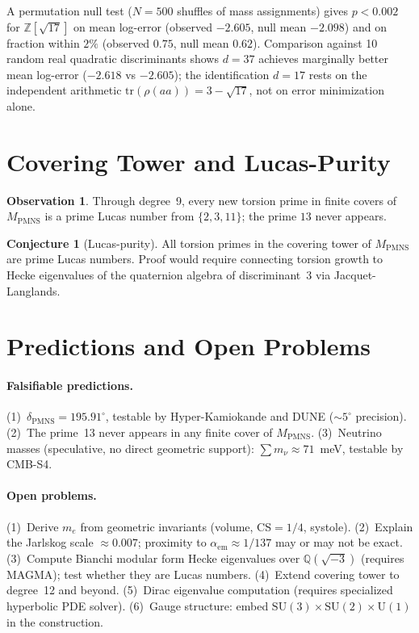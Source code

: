 \documentclass[11pt,a4paper]{article}
\theoremstyle{definition}
\newtheorem{observation}[theorem]{Observation}
\newtheorem{conjecture}[theorem]{Conjecture}
\theoremstyle{remark}
\newcommand{\MPMNS}{M_{\mathrm{PMNS}}}
\newcommand{\Zsev}{\mathbb{Z}[\sqrt{17}]}
\begin{document}
A permutation null test ($N=500$ shuffles of mass assignments) gives
$p<0.002$ for $\Zsev$ on mean log-error (observed $-2.605$,
null mean $-2.098$) and on fraction within $2\%$ (observed $0.75$,
null mean $0.62$).
Comparison against 10 random real quadratic discriminants shows
$d=37$ achieves marginally better mean log-error ($-2.618$ vs
$-2.605$); the identification $d=17$ rests on the independent
arithmetic $\mathrm{tr}(\rho(aa))=3-\sqrt{17}$, not on error
minimization alone.

\section{Covering Tower and Lucas-Purity}
\label{sec:covering}

\begin{observation}
Through degree~9, every new torsion prime in finite covers of
$\MPMNS$ is a prime Lucas number from $\{2,3,11\}$;
the prime $13$ never appears.
\end{observation}

\begin{conjecture}[Lucas-purity]
All torsion primes in the covering tower of $\MPMNS$ are prime Lucas numbers.
Proof would require connecting torsion growth to Hecke eigenvalues
of the quaternion algebra of discriminant~3 via Jacquet-Langlands.
\end{conjecture}

\section{Predictions and Open Problems}
\label{sec:predictions}

\paragraph{Falsifiable predictions.}
(1)~$\delta_{\mathrm{PMNS}} = 195.91^\circ$, testable by
Hyper-Kamiokande and DUNE ($\sim5^\circ$ precision).
(2)~The prime~13 never appears in any finite cover of $\MPMNS$.
(3)~Neutrino masses (speculative, no direct geometric support):
$\sum m_\nu\approx71$~meV, testable by CMB-S4.

\paragraph{Open problems.}
(1)~Derive $m_e$ from geometric invariants (volume, CS$=1/4$,
systole).
(2)~Explain the Jarlskog scale $\approx0.007$; proximity to
$\alpha_{\mathrm{em}}\approx1/137$ may or may not be exact.
(3)~Compute Bianchi modular form Hecke eigenvalues over
$\mathbb{Q}(\sqrt{-3})$ (requires MAGMA); test whether they are
Lucas numbers.
(4)~Extend covering tower to degree~12 and beyond.
(5)~Dirac eigenvalue computation (requires specialized hyperbolic
PDE solver).
(6)~Gauge structure: embed $\mathrm{SU}(3)\times\mathrm{SU}(2)
\times\mathrm{U}(1)$ in the construction.
\end{document}
